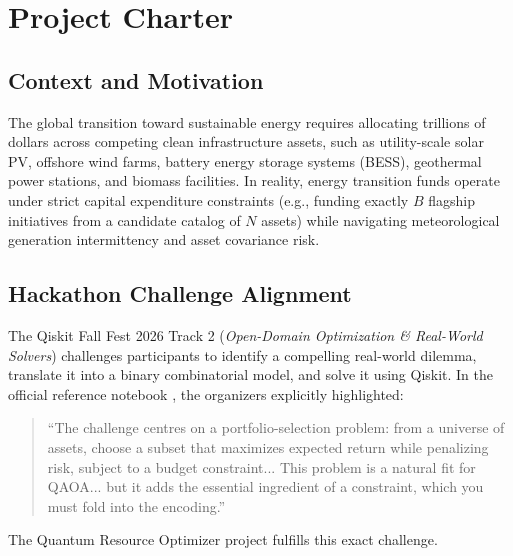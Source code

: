 \section{Project Charter}

\subsection{Context and Motivation}
The global transition toward sustainable energy requires allocating trillions of dollars across competing clean infrastructure assets, such as utility-scale solar PV, offshore wind farms, battery energy storage systems (BESS), geothermal power stations, and biomass facilities. In reality, energy transition funds operate under strict capital expenditure constraints (e.g., funding exactly $B$ flagship initiatives from a candidate catalog of $N$ assets) while navigating meteorological generation intermittency and asset covariance risk.

\subsection{Hackathon Challenge Alignment}
The Qiskit Fall Fest 2026 Track 2 (\textit{Open-Domain Optimization \& Real-World Solvers}) challenges participants to identify a compelling real-world dilemma, translate it into a binary combinatorial model, and solve it using Qiskit. In the official reference notebook \cite{tirado2026qaoa}, the organizers explicitly highlighted:
\begin{quote}
``The challenge centres on a portfolio-selection problem: from a universe of assets, choose a subset that maximizes expected return while penalizing risk, subject to a budget constraint... This problem is a natural fit for QAOA... but it adds the essential ingredient of a constraint, which you must fold into the encoding.''
\end{quote}
The Quantum Resource Optimizer project fulfills this exact challenge.

